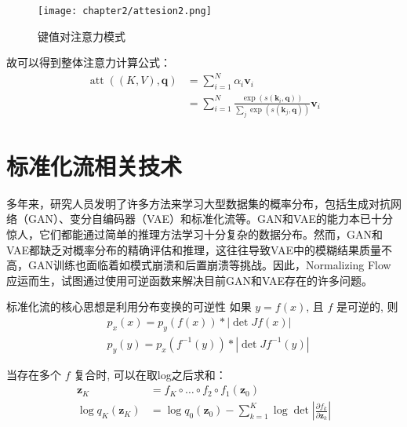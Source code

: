 \begin{figure}[ht]
    \centering
    \texttt{[image: chapter2/attesion2.png]}
    \caption{键值对注意力模式}
    \end{figure}
故可以得到整体注意力计算公式：
\begin{equation}
    \begin{aligned}
    \operatorname{att}((K, V), \mathbf{q}) &=\sum_{i=1}^N \alpha_i \mathbf{v}_i \\
    &=\sum_{i=1}^N \frac{\exp \left(s\left(\mathbf{k}_i, \mathbf{q}\right)\right)}{\sum_j \exp \left(s\left(\mathbf{k}_j, \mathbf{q}\right)\right)} \mathbf{v}_i
    \end{aligned}
    \end{equation}



\section{标准化流相关技术}
多年来，研究人员发明了许多方法来学习大型数据集的概率分布，包括生成对抗网络（GAN）\cite{gan}、变分自编码器（VAE）\cite{vae}和标准化流\cite{nf}等。GAN和VAE的能力本已十分惊人，它们都能通过简单的推理方法学习十分复杂的数据分布。然而，GAN和VAE都缺乏对概率分布的精确评估和推理，这往往导致VAE中的模糊结果质量不高，GAN训练也面临着如模式崩溃和后置崩溃等挑战。因此，Normalizing Flow应运而生，试图通过使用可逆函数来解决目前GAN和VAE存在的许多问题。

标准化流的核心思想是利用分布变换的可逆性 如果 $y=f(x)$, 且 $f$ 是可逆的, 则
\begin{equation}
    \begin{aligned}
        &p_x(x)=p_y(f(x)) *|\operatorname{det} J f(x)| \\
        &p_y(y)=p_x\left(f^{-1}(y)\right) *\left|\operatorname{det} J f^{-1}(y)\right|
        \end{aligned}
\end{equation}

当存在多个 $f$ 复合时, 可以在取log之后求和：
\begin{equation}
    \begin{aligned}
    \mathbf{z}_K &=f_K \circ \ldots \circ f_2 \circ f_1\left(\mathbf{z}_0\right) \\
    \log q_K\left(\mathbf{z}_K\right) &=\log q_0\left(\mathbf{z}_0\right)-\sum_{k=1}^K \log \operatorname{det}\left|\frac{\partial f_k}{\partial \mathbf{z}_k}\right|
    \end{aligned}
    \end{equation}

